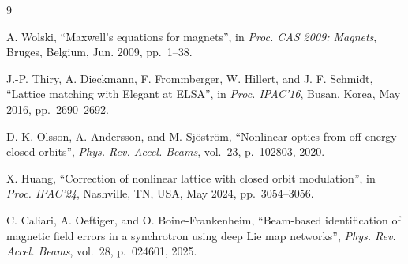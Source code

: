 \documentclass[letterpaper]{jacow}
\begin{document}
\begin{thebibliography}{9}

    A. Wolski, ``Maxwell's equations for magnets'', in
    \textit{Proc. CAS 2009: Magnets}, Bruges, Belgium, Jun. 2009, pp.~1--38.

    J.-P. Thiry, A. Dieckmann, F. Frommberger, W. Hillert, and J. F. Schmidt,
    ``Lattice matching with Elegant at ELSA'', in \textit{Proc. IPAC'16},
    Busan, Korea, May 2016, pp.~2690--2692.

    D. K. Olsson, A. Andersson, and M. Sjöstr\"om,
    ``Nonlinear optics from off-energy closed orbits'',
    \textit{Phys. Rev. Accel. Beams}, vol.~23, p.~102803, 2020.

    X. Huang, ``Correction of nonlinear lattice with closed orbit
    modulation'', in \textit{Proc. IPAC'24}, Nashville, TN, USA, May 2024,
    pp.~3054--3056. 

    C. Caliari, A. Oeftiger, and O. Boine-Frankenheim,
    ``Beam-based identification of magnetic field errors in a synchrotron
    using deep Lie map networks'', \textit{Phys. Rev. Accel. Beams}, vol.~28,
    p.~024601, 2025. 

\end{thebibliography}
\end{document}

